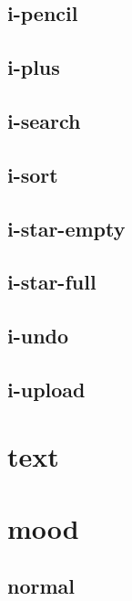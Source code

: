 \subsection{i-pencil}


\subsection{i-plus}


\subsection{i-search}

\subsection{i-sort}

\subsection{i-star-empty}


\subsection{i-star-full}


\subsection{i-undo}


\subsection{i-upload}












\section{text}




\section{mood}


\subsection{normal}


